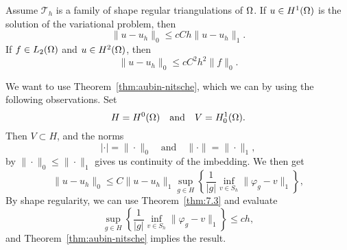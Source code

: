 \begin{kor}{\quad\label{kor:7.7}}
   Assume $\mathcal{T}_h$ is a family of shape regular triangulations of $\Omega$.
   If $u\in H^1(\Omega)$ is the solution of the variational problem, then 
   \begin{equation*}
    \|u-u_h\|_0 \leq cCh \|u-u_h\|_1.
   \end{equation*}
   If $f\in L_2(\Omega)$ and $u\in H^2(\Omega)$, then 
   \begin{equation*}
    \|u-u_h\|_0 \leq cC^2h^2 \|f\|_0.
   \end{equation*}
\end{kor}
\begin{bev}
   We want to use Theorem~\ref{thm:aubin-nitsche}, which we can by 
   using the following observations. Set 
    \begin{equation*}
        H = H^0(\Omega) \quad \text{and} \quad V = H^1_0(\Omega).
    \end{equation*}
    Then $V \subset H$, and the norms 
    \begin{equation*}
        |\cdot| = \|\cdot\|_0 \quad \text{and} \quad \|\cdot\| = \|\cdot\|_1,
    \end{equation*}
    by $\|\cdot\|_0 \leq \|\cdot\|_1$ gives us continuity of the imbedding.
    We then get
    \begin{equation*}
        \|u-u_h\|_0 \leq C \|u-u_h\|_1 \sup_{g\in H} \left \{ \frac{1}{|g|} \inf_{v \in S_h} \|\varphi_g - v\|_1 \right \},
    \end{equation*}
    By shape regularity, we can use Theorem~\ref{thm:7.3} and evaluate 
    \begin{equation*}
        \sup_{g\in H} \left \{ \frac{1}{|g|} \inf_{v \in S_h} \|\varphi_g - v\|_1 \right \}
        \leq ch,
    \end{equation*}
    and Theorem~\ref{thm:aubin-nitsche} implies the result.
\end{bev}